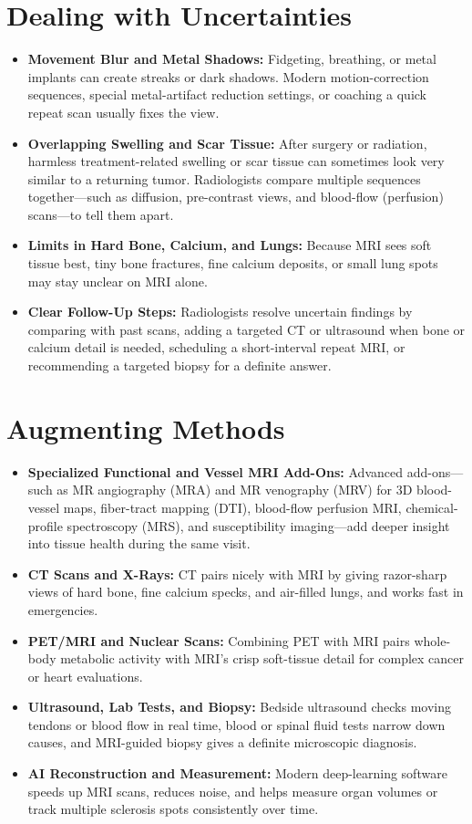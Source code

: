 \section{Dealing with Uncertainties}
\begin{itemize}
\item \textbf{Movement Blur and Metal Shadows:} Fidgeting, breathing, or metal implants can create streaks or dark shadows. Modern motion-correction sequences, special metal-artifact reduction settings, or coaching a quick repeat scan usually fixes the view.
\item \textbf{Overlapping Swelling and Scar Tissue:} After surgery or radiation, harmless treatment-related swelling or scar tissue can sometimes look very similar to a returning tumor. Radiologists compare multiple sequences together---such as diffusion, pre-contrast views, and blood-flow (perfusion) scans---to tell them apart.
\item \textbf{Limits in Hard Bone, Calcium, and Lungs:} Because MRI sees soft tissue best, tiny bone fractures, fine calcium deposits, or small lung spots may stay unclear on MRI alone.
\item \textbf{Clear Follow-Up Steps:} Radiologists resolve uncertain findings by comparing with past scans, adding a targeted CT or ultrasound when bone or calcium detail is needed, scheduling a short-interval repeat MRI, or recommending a targeted biopsy for a definite answer.
\end{itemize}

\section{Augmenting Methods}
\begin{itemize}
\item \textbf{Specialized Functional and Vessel MRI Add-Ons:} Advanced add-ons---such as MR angiography (MRA) and MR venography (MRV) for 3D blood-vessel maps, fiber-tract mapping (DTI), blood-flow perfusion MRI, chemical-profile spectroscopy (MRS), and susceptibility imaging---add deeper insight into tissue health during the same visit.
\item \textbf{CT Scans and X-Rays:} CT pairs nicely with MRI by giving razor-sharp views of hard bone, fine calcium specks, and air-filled lungs, and works fast in emergencies.
\item \textbf{PET/MRI and Nuclear Scans:} Combining PET with MRI pairs whole-body metabolic activity with MRI's crisp soft-tissue detail for complex cancer or heart evaluations.
\item \textbf{Ultrasound, Lab Tests, and Biopsy:} Bedside ultrasound checks moving tendons or blood flow in real time, blood or spinal fluid tests narrow down causes, and MRI-guided biopsy gives a definite microscopic diagnosis.
\item \textbf{AI Reconstruction and Measurement:} Modern deep-learning software speeds up MRI scans, reduces noise, and helps measure organ volumes or track multiple sclerosis spots consistently over time.
\end{itemize}

